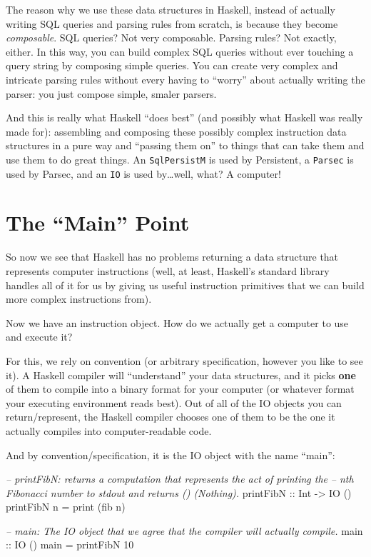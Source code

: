 \documentclass[]{article}
\newenvironment{Shaded}{}{}
\newcommand{\DataTypeTok}[1]{\textcolor[rgb]{0.56,0.13,0.00}{{#1}}}
\newcommand{\DecValTok}[1]{\textcolor[rgb]{0.25,0.63,0.44}{{#1}}}
\newcommand{\CommentTok}[1]{\textcolor[rgb]{0.38,0.63,0.69}{\textit{{#1}}}}
\newcommand{\OtherTok}[1]{\textcolor[rgb]{0.00,0.44,0.13}{{#1}}}
\newcommand{\FunctionTok}[1]{\textcolor[rgb]{0.02,0.16,0.49}{{#1}}}
\newcommand{\NormalTok}[1]{{#1}}
\begin{document}
The reason why we use these data structures in Haskell, instead of
actually writing SQL queries and parsing rules from scratch, is because
they become \emph{composable}. SQL queries? Not very composable. Parsing
rules? Not exactly, either. In this way, you can build complex SQL
queries without ever touching a query string by composing simple
queries. You can create very complex and intricate parsing rules without
every having to ``worry'' about actually writing the parser: you just
compose simple, smaler parsers.

And this is really what Haskell ``does best'' (and possibly what Haskell
was really made for): assembling and composing these possibly complex
instruction data structures in a pure way and ``passing them on'' to
things that can take them and use them to do great things. An
\texttt{SqlPersistM} is used by Persistent, a \texttt{Parsec} is used by
Parsec, and an \texttt{IO} is used by\ldots{}well, what? A computer!

\section{\texorpdfstring{The ``Main''
Point}{The Main Point}}\label{the-main-point}

So now we see that Haskell has no problems returning a data structure
that represents computer instructions (well, at least, Haskell's
standard library handles all of it for us by giving us useful
instruction primitives that we can build more complex instructions
from).

Now we have an instruction object. How do we actually get a computer to
use and execute it?

For this, we rely on convention (or arbitrary specification, however you
like to see it). A Haskell compiler will ``understand'' your data
structures, and it picks \textbf{one} of them to compile into a binary
format for your computer (or whatever format your executing environment
reads best). Out of all of the IO objects you can return/represent, the
Haskell compiler chooses one of them to be the one it actually compiles
into computer-readable code.

And by convention/specification, it is the IO object with the name
``main'':

\begin{Shaded}
\begin{Highlighting}[]
\CommentTok{--  printFibN: returns a computation that represents the act of printing the}
\CommentTok{--      nth Fibonacci number to stdout and returns () (Nothing).}
\OtherTok{printFibN ::} \DataTypeTok{Int} \OtherTok{->} \DataTypeTok{IO} \NormalTok{()}
\NormalTok{printFibN n }\FunctionTok{=} \NormalTok{print (fib n)}

\CommentTok{--  main: The IO object that we agree that the compiler will actually compile.}
\OtherTok{main ::} \DataTypeTok{IO} \NormalTok{()}
\NormalTok{main }\FunctionTok{=} \NormalTok{printFibN }\DecValTok{10}
\end{Highlighting}
\end{Shaded}
\end{document}
